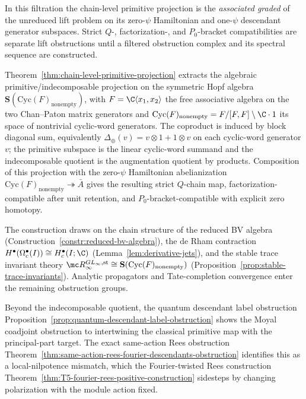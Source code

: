 In this filtration the chain-level primitive projection is the
\emph{associated graded} of the unreduced lift problem on its
zero-\(\psi\) Hamiltonian and one-\(\psi\) descendant generator
subspaces.  Strict \(Q\)-, factorization-, and \(P_0\)-bracket
compatibilities are separate lift obstructions until a filtered
obstruction complex and its spectral sequence are constructed.

Theorem~\ref{thm:chain-level-primitive-projection} extracts the
algebraic primitive/indecomposable projection on the symmetric Hopf
algebra
\(\mathbf S(\mathrm{Cyc}(F)_{\mathrm{nonempty}})\), with
\(F=\C\langle x_1,x_2\rangle\) the free associative algebra on the two
Chan--Paton matrix generators and
\(\mathrm{Cyc}(F)_{\mathrm{nonempty}}=F/[F,F]\setminus\C\cdot 1\) its
space of nontrivial cyclic-word generators.  The coproduct is induced by
block diagonal sum, equivalently
\(\Delta_\oplus(v)=v\otimes 1+1\otimes v\) on each cyclic-word
generator \(v\); the primitive subspace is the linear cyclic-word
summand and the indecomposable quotient is the augmentation quotient by
products.  Composition of this projection with the
zero-\(\psi\) Hamiltonian abelianization
\(\mathrm{Cyc}(F)_{\mathrm{nonempty}}\twoheadrightarrow\bar A\) gives the
resulting strict \(Q\)-chain map, factorization-compatible after
unit retention, and \(P_0\)-bracket-compatible with explicit zero
homotopy.

The construction draws on the chain structure of the reduced BV algebra
(Construction~\ref{constr:reduced-bv-algebra}), the de Rham
contraction \(H^\bullet(\Omega^\bullet_c(I))\cong H^\bullet_c(I;\C)\)
(Lemma~\ref{lem:derivative-jets}), and the stable trace invariant
theory \(\mc R_\infty^{GL_\infty,\mathrm{st}}\cong
\mathbf S(\mathrm{Cyc}(F)_{\mathrm{nonempty}})\)
(Proposition~\ref{prop:stable-trace-invariants}). Analytic propagators
and Tate-completion convergence enter the remaining obstruction groups.

Beyond the indecomposable quotient, the quantum descendant label
obstruction Proposition~\ref{prop:quantum-descendant-label-obstruction}
shows the Moyal coadjoint obstruction to intertwining the classical
primitive map with the principal-part target.  The exact same-action
Rees obstruction
Theorem~\ref{thm:same-action-rees-fourier-descendants-obstruction} identifies this
as a local-nilpotence mismatch, which the Fourier-twisted Rees
construction
Theorem~\ref{thm:T5-fourier-rees-positive-construction} sidesteps by
changing polarization with the module action fixed.

